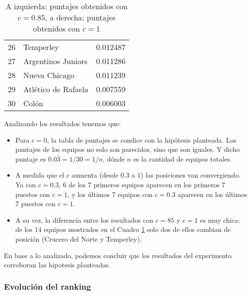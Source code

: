 \begin{table}[H]
\begin{center}
\begin{tabular}{| c | l | c |}
            26 & Temperley & 0.012487 \\
            27 & Argentinos Juniors & 0.011286 \\
            28 & Nueva Chicago & 0.011239 \\
            29 & Atlético de Rafaela & 0.007559 \\
            30 & Colón & 0.006003 \\
            \hline
        \end{tabular}
        \captionsetup{justification=centering}
        \caption{A izquierda: puntajes obtenidos con $c=0.85$, a derecha: puntajes obtenidos con $c=1$}
        \label{exp_resultados_variar_c_2}
    \end{center}
\end{table}

Analizando los resultados tenemos que:

\begin{itemize}
    \item Para $c=0$, la tabla de puntajes se condice con la hipótesis planteada.
        Los puntajes de los equipos no solo son parecidos, sino que son iguales.
        Y dicho puntaje es $0.0\hat{3} = 1/30 = 1/n$, dónde $n$ es la cantidad de
        equipos totales.
    \item A medida que el $c$ aumenta (desde $0.3$ a $1$) las posiciones van convergiendo.
        Ya con $c=0.3$, 6 de los 7 primeros equipos aparecen en los primeros 7 puestos con $c=1$,
        y los últimos 7 equipos con $c=0.3$ aparecen en los últimos 7 puestos con $c=1$.
    \item A su vez, la diferencia entre los resultados con $c=85$ y $c=1$ es muy chica:
        de los 14 equipos mostrados en el Cuadro \ref{exp_resultados_variar_c_2} solo dos
        de ellos cambian de posición (Crucero del Norte y Temperley).
\end{itemize}

En base a lo analizado, podemos concluir que los resultados del experimento corroboran
las hipotesis planteadas.

\subsubsection{Evolución del ranking}

